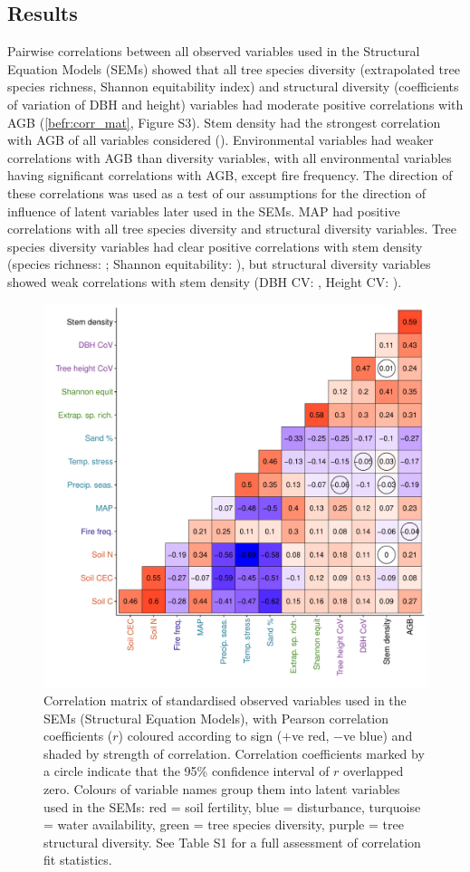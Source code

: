 \begin{refsection}
\section{Results}
\label{befr:sec:results}

Pairwise correlations between all observed variables used in the Structural Equation Models (SEMs) showed that all tree species diversity (extrapolated tree species richness, Shannon equitability index) and structural diversity (coefficients of variation of DBH and height) variables had moderate positive correlations with AGB (\autoref{befr:corr_mat}, Figure S3). Stem density had the strongest correlation with AGB of all variables considered (\ccib{}). Environmental variables had weaker correlations with AGB than diversity variables, with all environmental variables having significant correlations with AGB, except fire frequency. The direction of these correlations was used as a test of our assumptions for the direction of influence of latent variables later used in the SEMs. MAP had positive correlations with all tree species diversity and structural diversity variables. Tree species diversity variables had clear positive correlations with stem density (species richness: \ccsi{}; Shannon equitability: \ccei{}), but structural diversity variables showed weak correlations with stem density (DBH CV: \ccdvi{}, Height CV: \cchvi{}).

\begin{figure}
	\includegraphics[width=0.6\linewidth]{img/corr_mat}
	\caption[Correlation matrix of observed variables used in analysis]{Correlation matrix of standardised observed variables used in the SEMs (Structural Equation Models), with Pearson correlation coefficients ($r$) coloured according to sign ($+$ve red, $-$ve blue) and shaded by strength of correlation. Correlation coefficients marked by a circle indicate that the 95\% confidence interval of $r$ overlapped zero. Colours of variable names group them into latent variables used in the SEMs: red = soil fertility, blue = disturbance, turquoise = water availability, green = tree species diversity, purple = tree structural diversity. See Table S1 for a full assessment of correlation fit statistics.}
	\label{befr:corr_mat}
\end{figure}


\end{refsection}
